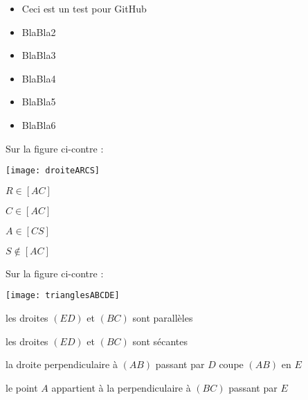 \begin{acquis}
\begin{itemize}
\item Ceci est un test pour GitHub
\item BlaBla2
\item BlaBla3
\item BlaBla4
\item BlaBla5
\item BlaBla6
\end{itemize}
\end{acquis} %


\begin{QCM}
  \begin{GroupeQCM} %
    \begin{exercice}
     Sur la figure ci-contre : \vspace{-2em}\begin{center}\texttt{[image: droiteARCS]}\end{center}\vspace{-1em}
      \begin{ChoixQCM}{4}
      \item $R \in [AC]$
      \item $C \in [AC]$
      \item $A \in [CS]$
      \item $S \notin [AC]$
      \end{ChoixQCM}
\begin{corrige}
   \end{corrige}
    \end{exercice}
 
    
    \begin{exercice}
     Sur la figure ci-contre : \vspace{-2em}\begin{center}\texttt{[image: trianglesABCDE]}\end{center}\vspace{-1em}
      \begin{ChoixQCM}{4}
      \item les droites $(ED)$ et $(BC)$ sont parallèles
      \item les droites $(ED)$ et $(BC)$ sont sécantes
      \item la droite perpendiculaire à $(AB)$ passant par $D$ coupe $(AB)$ en $E$
      \item le point $A$ appartient à la  perpendiculaire à $(BC)$ passant par $E$
      \end{ChoixQCM}
\begin{corrige}
   \end{corrige}
    \end{exercice}



\end{GroupeQCM}
\end{QCM}
